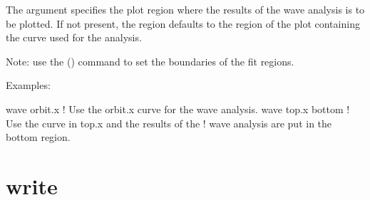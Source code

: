 {{{{{{{{{The  argument
specifies the plot region where the results of the wave analysis is to be plotted. If not
present, the region defaults to the region of the plot containing the curve used for the
analysis.

Note: use the  () command to set the boundaries of the fit regions.

Examples:
\begin{example}
  wave orbit.x      ! Use the orbit.x curve for the wave analysis.
  wave top.x bottom ! Use the curve in top.x and the results of the 
                    !  wave analysis are put in the bottom region.
\end{example}


\section{write}
\label{s:write}

}}}}}}}}}
